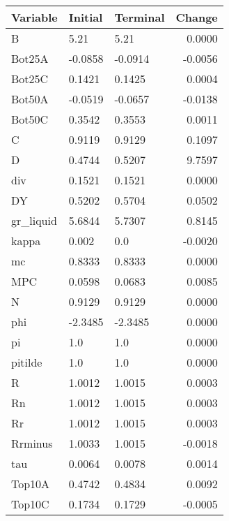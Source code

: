 \begin{table}
\centering
\label{tab:stst_comparison_very_slow_phi_wedge_permanent_asymmetric}
\begin{tabular}{lllr}
\toprule
                Variable & Initial & Terminal &  Change \\
\midrule
                       B &    5.21 &     5.21 &  0.0000 \\
                  Bot25A & -0.0858 &  -0.0914 & -0.0056 \\
                  Bot25C &  0.1421 &   0.1425 &  0.0004 \\
                  Bot50A & -0.0519 &  -0.0657 & -0.0138 \\
                  Bot50C &  0.3542 &   0.3553 &  0.0011 \\
                       C &  0.9119 &   0.9129 &  0.1097 \\
                       D &  0.4744 &   0.5207 &  9.7597 \\
                     div &  0.1521 &   0.1521 &  0.0000 \\
                      DY &  0.5202 &   0.5704 &  0.0502 \\
               gr\_liquid &  5.6844 &   5.7307 &  0.8145 \\
                   kappa &   0.002 &      0.0 & -0.0020 \\
                      mc &  0.8333 &   0.8333 &  0.0000 \\
                     MPC &  0.0598 &   0.0683 &  0.0085 \\
                       N &  0.9129 &   0.9129 &  0.0000 \\
                     phi & -2.3485 &  -2.3485 &  0.0000 \\
                      pi &     1.0 &      1.0 &  0.0000 \\
                 pitilde &     1.0 &      1.0 &  0.0000 \\
                       R &  1.0012 &   1.0015 &  0.0003 \\
                      Rn &  1.0012 &   1.0015 &  0.0003 \\
                      Rr &  1.0012 &   1.0015 &  0.0003 \\
                 Rrminus &  1.0033 &   1.0015 & -0.0018 \\
                     tau &  0.0064 &   0.0078 &  0.0014 \\
                  Top10A &  0.4742 &   0.4834 &  0.0092 \\
                  Top10C &  0.1734 &   0.1729 & -0.0005 \\

\end{tabular}
\end{table}
